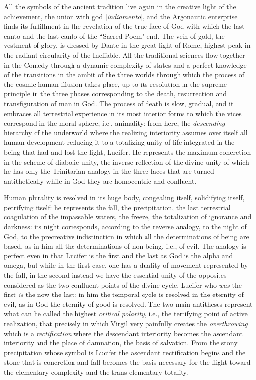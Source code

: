 All the symbols of the ancient tradition live again in the creative light of the achievement, the union with god [\emph{indiamento}], and the Argonautic enterprise finds its fulfillment in the revelation of the true face of God with which the last canto and the last canto of the ``Sacred Poem" end. The vein of gold, the vestment of glory, is dressed by Dante in the great light of Rome, highest peak in the radiant circularity of the Ineffable. All the traditional sciences flow together in the Comedy through a dynamic complexity of states and a perfect knowledge of the transitions in the ambit of the three worlds through which the process of the cosmic-human illusion takes place, up to its resolution in the supreme principle in the three phases corresponding to the death, resurrection and transfiguration of man in God. The process of death is slow, gradual, and it embraces all terrestrial experience in its most interior forms to which the vices correspond in the moral sphere, i.e., animality: from here, the \emph{descending} hierarchy of the underworld where the realizing interiority assumes over itself all human development reducing it to a totalizing unity of life integrated in the being that had and lost the light, Lucifer. He represents the maximum concretion in the scheme of diabolic unity, the inverse reflection of the divine unity of which he has only the Trinitarian analogy in the three faces that are turned antithetically while in God they are homocentric and confluent.

Human plurality is resolved in its huge body, congealing itself, solidifying itself, petrifying itself: he represents the fall, the precipitation, the last terrestrial coagulation of the impassable waters, the freeze, the totalization of ignorance and darkness: its night corresponds, according to the reverse analogy, to the night of God, to the precreative indistinction in which all the determinations of being are based, as in him all the determinations of non-being, i.e., of evil. The analogy is perfect even in that Lucifer is the first and the last as God is the alpha and omega, but while in the first case, one has a duality of movement represented by the fall, in the second instead we have the essential unity of the opposites considered as the two confluent points of the divine cycle. Lucifer who \emph{was} the first \emph{is} the now the last: in him the temporal cycle is resolved in the eternity of evil, as in God the eternity of good is resolved. The two main antitheses represent what can be called the highest \emph{critical polarity}, i.e., the terrifying point of active realization, that precisely in which Virgil very painfully creates the \emph{overthrowing} which is a \emph{rectification} where the descendant interiority becomes the ascendant interiority and the place of damnation, the basis of salvation. From the stony precipitation whose symbol is Lucifer the ascendant rectification begins and the stone that is concretion and fall becomes the basis necessary for the flight toward the elementary complexity and the trans-elementary totality.

